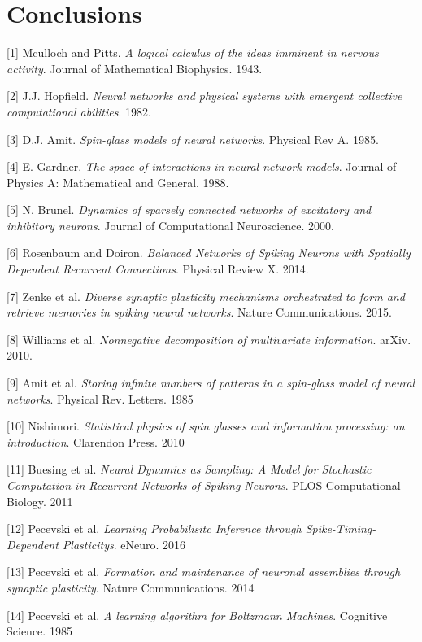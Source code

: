 \documentclass{ucetd}
\begin{document}
\chapter{Conclusions}


\makebibliography

[1] Mculloch and Pitts. \textit{A logical calculus of the ideas imminent in nervous activity}. Journal of Mathematical Biophysics. 1943.

[2] J.J. Hopfield. \textit{Neural networks and physical systems with emergent collective computational abilities}. 1982.

[3] D.J. Amit. \textit{Spin-glass models of neural networks}. Physical Rev A. 1985.

[4] E. Gardner. \textit{The space of interactions in neural network models}. Journal of Physics A: Mathematical and General. 1988.

[5] N. Brunel. \textit{Dynamics of sparsely connected networks of excitatory and inhibitory neurons}. Journal of Computational Neuroscience. 2000. 

[6] Rosenbaum and Doiron. \textit{Balanced Networks of Spiking Neurons with Spatially Dependent Recurrent Connections}. Physical Review X. 2014.

[7] Zenke et al. \textit{Diverse synaptic plasticity mechanisms
orchestrated to form and retrieve memories
in spiking neural networks}. Nature Communications. 2015.

[8] Williams et al. \textit{Nonnegative decomposition of multivariate information}. arXiv. 2010.

[9] Amit et al. \textit{Storing infinite numbers of patterns in a spin-glass model of neural networks}. Physical Rev. Letters. 1985

[10] Nishimori. \textit{Statistical physics of spin glasses and information processing: an introduction}. Clarendon Press. 2010

[11] Buesing et al. \textit{Neural Dynamics as Sampling: A Model for Stochastic Computation in Recurrent Networks of Spiking Neurons}. PLOS Computational Biology. 2011

[12] Pecevski et al. \textit{Learning Probabilisitc Inference through Spike-Timing-Dependent Plasticitys}. eNeuro. 2016

[13] Pecevski et al. \textit{Formation and maintenance of neuronal assemblies through synaptic plasticity}. Nature Communications. 2014

[14] Pecevski et al. \textit{A learning algorithm for Boltzmann Machines}. Cognitive Science. 1985

%
%
\end{document}
